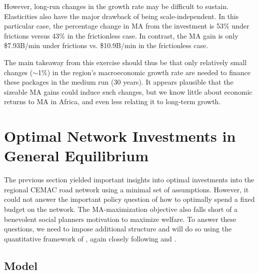 \documentclass[a4paper]{article}
\begin{document}
However, long-run changes in the growth rate may be difficult to sustain. Elasticities also have the major drawback of being scale-independent. In this particular case, the percentage change in MA from the investment is 53\% under frictions versus 43\% in the frictionless case. In contrast, the MA gain is only \$7.93B/min under frictions vs. \$10.9B/min in the frictionless case. \newline 

The main takeaway from this exercise should thus be that only relatively small changes ($\sim$1\%) in the region's macroeconomic growth rate are needed to finance these packages in the medium run (30 years). It appears plausible that the sizeable MA gains could induce such changes, but we know little about economic returns to MA in Africa, and even less relating it to long-term growth. %




\newpage


\section{Optimal Network Investments in General Equilibrium}

The previous section yielded important insights into optimal investments into the regional CEMAC road network using a minimal set of assumptions. However, it could not answer the important policy question of how to optimally spend a fixed budget on the network. The MA-maximization objective also falls short of a benevolent social planners motivation to maximize welfare. To answer these questions, we need to impose additional structure and will do so using the quantitative framework of \citet{fajgelbaum2020optimal}, again closely following \citet{krantz2024optimal} and \citet{graff2024spatial}. %


\subsection{Model}
\end{document}
